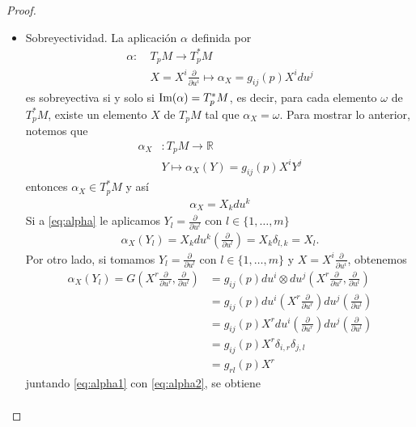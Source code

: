 \documentclass[10pt,a4paper]{report}
\begin{document}
\begin{proof}
\begin{itemize}
		\item Sobreyectividad. 	La aplicación $\alpha$ definida por
		\begin{align*}
			\alpha :\  &T_{p}M  \longrightarrow T^{*}_{p}M\\
			&X = X^{i}\frac{\partial}{\partial u^{i}} \mapsto \alpha_{X} = g_{ij}(p)X^{i}du^{j}
		\end{align*}
	 es sobreyectiva si y solo si $\textup{Im}(\alpha) = T^{*}_{p}M$, es decir, para cada elemento $\omega$ de $T^{*}_{p}M$, existe un elemento $X$ de $T_{p}M$ tal que $\alpha_{X} = \omega$. Para mostrar lo anterior, notemos que
	 \begin{align*}
	 	\alpha_{X} &: T_{p}M \rightarrow \mathbb{R}\\
	 	            & Y \mapsto \alpha_{X}(Y) = g_{ij}(p)X^{i}Y^{j}
	 \end{align*}
    entonces $\alpha_{X}\in T^{*}_{p}M$ y así
    \begin{align}
    	\alpha_{X} = X_{k}du^{k}\label{eq:alpha}
    \end{align}
    Si a \eqref{eq:alpha} le aplicamos $Y_{l} = \frac{\partial}{\partial u^{l}}$ con $l\in \{1,\dots,m\}$
    \begin{align}
    	\alpha_{X}\left( Y_{l} \right)  = X_{k}du^{k}\left( \frac{\partial}{\partial u^{l}}\right) = X_{k}\delta_{l,k} = X_{l}.\label{eq:alpha1}
    \end{align}
    Por otro lado, si tomamos $Y_{l} = \frac{\partial}{\partial u^{l}}$ con $l\in \{1,\dots,m\}$ y $X = X^{i}\frac{\partial}{\partial u^{i}}$, obtenemos
    \begin{align}
    	\alpha_{X}(Y_{l}) = G\left(X^{r}\frac{\partial}{\partial u^{r}},\frac{\partial}{\partial u^{l}} \right) &= g_{ij}(p)du^{i}\otimes du^{j} \left(X^{r}\frac{\partial}{\partial u^{r}},\frac{\partial}{\partial u^{l}} \right)\nonumber\\ &= g_{ij}(p)du^{i}\left(X^{r}\frac{\partial}{\partial u^{r}}\right) du^{j}\left( \frac{\partial}{\partial u^{l}} \right)\nonumber\\
    	 &=g_{ij}(p)X^{r}du^{i}\left(\frac{\partial}{\partial u^{r}}\right) du^{j}\left( \frac{\partial}{\partial u^{l}} \right)\nonumber\\
    	 &= g_{ij}(p)X^{r}\delta_{i,r}\delta_{j,l}\nonumber\\
    	 &= g_{rl}(p)X^{r}\label{eq:alpha2}
    \end{align}
    juntando \eqref{eq:alpha1} con \eqref{eq:alpha2}, se obtiene
    \begin{align}

\end{align}
\end{itemize}
\end{proof}
\end{document}
